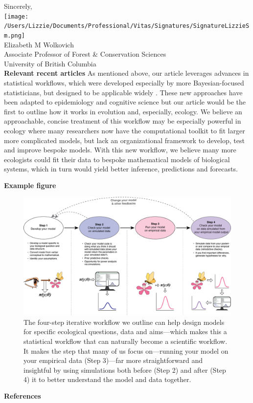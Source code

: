\documentclass[11pt]{article}
\begin{document}
Sincerely,\\

\texttt{[image: /Users/Lizzie/Documents/Professional/Vitas/Signatures/SignatureLizzieSm.png]} \\

Elizabeth M Wolkovich\\
Associate Professor of Forest \& Conservation Sciences\\ 
University of British Columbia\\

{\bf Relevant recent articles}
As mentioned above, our article leverages advances in statistical workflows, which were developed especially by more Bayesian-focused statisticians,  but designed to be applicable widely \citep{betanworkflow,gelman2020bayesian}. These new approaches have been adapted to epidemiology and cognitive science  \citep{grinsztajn2021,schad2021} but our article would be the first to outline how it works in evolution and, especially, ecology. We believe an approachable, concise treatment of this workflow may be especially powerful in ecology where many researchers now have the computational toolkit to fit larger more complicated models, but lack an organizational framework to develop, test and improve bespoke models. With this new workflow, we believe many more ecologists could fit their data to bespoke mathematical models of biological systems, which in turn would yield better inference, predictions and forecasts. 

\newpage
{\bf Example figure}

\begin{figure}[ht]
\centering
\noindent \includegraphics[width=1\textwidth]{..//figures/workflow.png}
\caption{The four-step iterative workflow we outline can help design models for specific ecological questions, data and aims---which makes this a statistical workflow that can naturally become a scientific workflow. It makes the step that many of us focus on---running your model on your empirical data (Step 3)---far more straightforward and insightful by using simulations both before (Step 2) and after (Step 4) it to better understand the model and data together.}
\label{fig:workflow}
\end{figure}

\newpage
{\bf References}
\vspace{-4ex}

\end{document}

